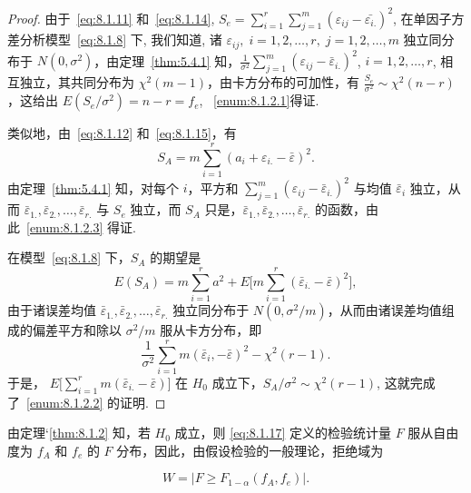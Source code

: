\begin{proof}
由于~\eqref{eq:8.1.11} 和~\eqref{eq:8.1.14}, $S_{e}=\sum\limits_{i=1}^{r} \sum\limits_{j=1}^{m}(\varepsilon_{i j}-\bar{\varepsilon_{i.}})^{2}$, 在单因子方差分析模型~\eqref{eq:8.1.8} 下, 我们知道, 诸 $\varepsilon_{ij}, \; i=1,2,\ldots,r,\; j=1,2,\ldots,m$ 独立同分布于 $N(0,\sigma^2)$，由定理~\ref{thm:5.4.1} 知，$\tfrac{1}{\sigma^2} \sum\limits_{j=1}^m (\varepsilon_{ij} - \bar{\varepsilon}_{i.})^2$, $i=1,2,\ldots,r$, 相互独立，其共同分布为 $\chi^2(m-1)$，由卡方分布的可加性，有 $\tfrac{S_e}{\sigma^2} \sim \chi^2(n-r)$，这给出 $E(S_e/\sigma^2) = n-r=f_e$, ~\ref{enum:8.1.2.1}得证.

类似地，由~\eqref{eq:8.1.12} 和~\eqref{eq:8.1.15}，有
\begin{equation*}
  S_A =  m \sum_{i=1}^r (a_i + \varepsilon_{i.} - \bar{\varepsilon})^2.
\end{equation*}
由定理~\ref{thm:5.4.1} 知，对每个 $i$，平方和 $\sum\limits_{j=1}^m (\varepsilon_{ij} - \bar{\varepsilon}_{i.})^2$ 与均值 $\bar{\varepsilon}_{i}$ 独立，从而 $\bar{\varepsilon}_{1.}, \bar{\varepsilon}_{2.},\ldots,\bar{\varepsilon}_{r.}$ 与 $S_e$ 独立，而 $S_A$ 只是，$\bar{\varepsilon}_{1.}, \bar{\varepsilon}_{2.},\ldots,\bar{\varepsilon}_{r.}$ 的函数，由此~\ref{enum:8.1.2.3} 得证.

在模型~\ref{eq:8.1.8} 下，$S_A$ 的期望是
\begin{equation*}
  E(S_A) = m \sum_{i=1}^r a^2 + E\big[m\sum_{i=1}^r (\bar{\varepsilon}_{i.} - \bar{\varepsilon})^2\big],
\end{equation*}
由于诸误差均值 $\bar{\varepsilon}_{1.}, \bar{\varepsilon}_{2.},\ldots,\bar{\varepsilon}_{r.}$ 独立同分布于 $N(0, \sigma^2/m)$，从而由诸误差均值组成的偏差平方和除以 $\sigma^2/m$ 服从卡方分布，即
\begin{equation*}
  \frac{1}{\sigma^{2}} \sum_{i=1}^{r} m\left(\bar{\varepsilon}_{i},-\bar{\varepsilon}\right)^{2}-\chi^{2}(r-1).
\end{equation*}
于是， $E\big[\sum\limits_{i=1}^r m(\bar{\varepsilon}_{i.} - \bar{\varepsilon})\big]$ 在 $H_0$ 成立下，$S_A/\sigma^2 \sim \chi^2(r-1)$, 这就完成了~\ref{enum:8.1.2.2} 的证明.
\end{proof}

由定理`\ref{thm:8.1.2} 知，若 $H_0$ 成立，则 \eqref{eq:8.1.17} 定义的检验统计量 $F$ 服从自由度为 $f_A$ 和 $f_e$ 的 $F$ 分布，因此，由假设检验的一般理论，拒绝域为

\begin{equation}\label{eq:8.1.18}
W =\left\lvert F \geq F_{1-\alpha}(f_{A}, f_{e}) \right\rvert .
\end{equation}

